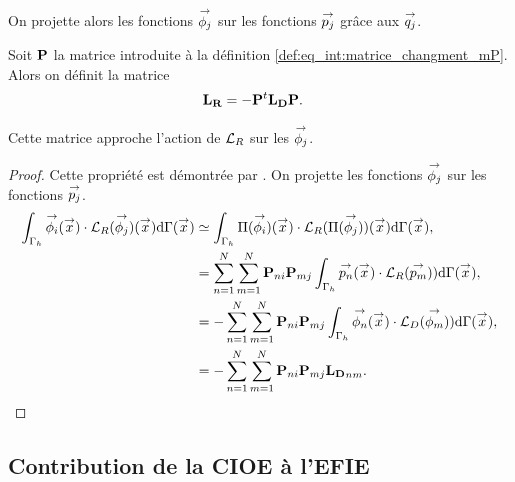     On projette alors les fonctions \(\phij\) sur les fonctions \(\pj\) grâce aux \(\qj\).
    \begin{defn}
      Soit \(\mPP\) la matrice introduite à la définition \ref{def:eq_int:matrice_changment_mP}. Alors on définit la matrice
      \begin{align*}
        \mLR & = -\mPP^t\mLD\mPP.
      \end{align*}
    \end{defn}
    \begin{prop}
      Cette matrice approche l'action de \(\LR\) sur les \(\phij\).
    \end{prop}
    \begin{proof}
      Cette propriété est démontrée par \cite[eq.~(17)]{stupfel_implementation_2015}. On projette les fonctions \(\phij\) sur les fonctions \(\pj\).
      \begin{align*}
        \int_{\Gamma_h} \phii(\vx) \cdot \LR(\phij)(\vx) \dd{\Gamma}(\vx) &\simeq \int_{\Gamma_h} \Pi(\phii)(\vx) \cdot \LR(\Pi(\phij)) (\vx) \dd{\Gamma}(\vx),
        \\
        &=\sum_{n=1}^{N} \sum_{m=1}^{N} \mPP_{ni} \mPP_{mj} \int_{\Gamma_h}\pn(\vx)\cdot\LR(\ppm)) \dd{\Gamma}(\vx),
        \\
        &=-\sum_{n=1}^{N} \sum_{m=1}^{N} \mPP_{ni} \mPP_{mj} \int_{\Gamma_h}\phin(\vx)\cdot\LD(\phim)) \dd{\Gamma}(\vx),
        \\
        &=-\sum_{n=1}^{N} \sum_{m=1}^{N} \mPP_{ni} \mPP_{mj} \mLD_{nm}.
      \end{align*}
    \end{proof}

  \subsection{Contribution de la CIOE à l'EFIE}

